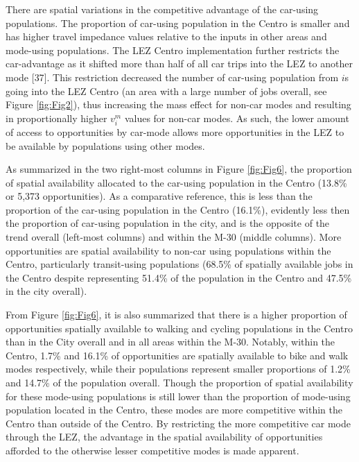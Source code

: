 \documentclass[10pt,letterpaper]{article}
\begin{document}
There are spatial variations in the competitive advantage of the
car-using populations. The proportion of car-using population in the
Centro is smaller and has higher travel impedance values relative to the
inputs in other areas and mode-using populations. The LEZ Centro
implementation further restricts the car-advantage as it shifted more
than half of all car trips into the LEZ to another mode {[}37{]}. This
restriction decreased the number of car-using population from \(i\)s
going into the LEZ Centro (an area with a large number of jobs overall,
see Figure \ref{fig:Fig2}), thus increasing the mass effect for non-car
modes and resulting in proportionally higher \(v_i^m\) values for
non-car modes. As such, the lower amount of access to opportunities by
car-mode allows more opportunities in the LEZ to be available by
populations using other modes.

As summarized in the two right-most columns in Figure \ref{fig:Fig6},
the proportion of spatial availability allocated to the car-using
population in the Centro (13.8\% or 5,373 opportunities). As a
comparative reference, this is less than the proportion of the car-using
population in the Centro (16.1\%), evidently less then the proportion of
car-using population in the city, and is the opposite of the trend
overall (left-most columns) and within the M-30 (middle columns). More
opportunities are spatial availability to non-car using populations
within the Centro, particularly transit-using populations (68.5\% of
spatially available jobs in the Centro despite representing 51.4\% of
the population in the Centro and 47.5\% in the city overall).

From Figure \ref{fig:Fig6}, it is also summarized that there is a higher
proportion of opportunities spatially available to walking and cycling
populations in the Centro than in the City overall and in all areas
within the M-30. Notably, within the Centro, 1.7\% and 16.1\% of
opportunities are spatially available to bike and walk modes
respectively, while their populations represent smaller proportions of
1.2\% and 14.7\% of the population overall. Though the proportion of
spatial availability for these mode-using populations is still lower
than the proportion of mode-using population located in the Centro,
these modes are more competitive within the Centro than outside of the
Centro. By restricting the more competitive car mode through the LEZ,
the advantage in the spatial availability of opportunities afforded to
the otherwise lesser competitive modes is made apparent.
\end{document}
